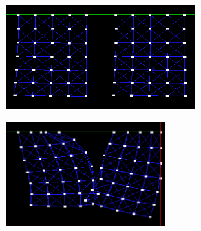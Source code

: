 \begin{figure}[h!]
\centering
\begin{minipage}[t]{.45\textwidth}
  \centering
  \includegraphics[height=4cm]{img/curtain.png}
  \label{fig:flag}
\end{minipage}\hfill
\begin{minipage}[t]{.45\textwidth}
  \centering
  \includegraphics[height=4cm]{img/curtain2.png}
  \label{fig:flag2}
\end{minipage}
\end{figure}



